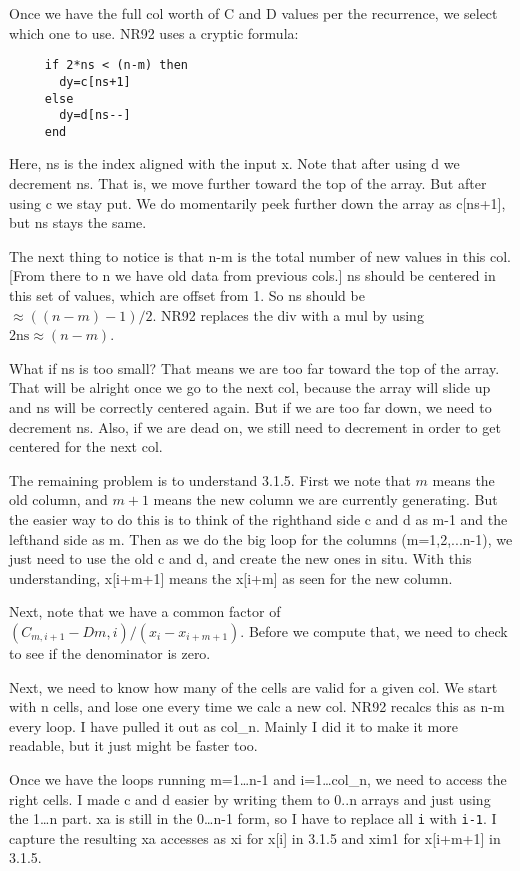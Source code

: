 Once we have the full col worth of C and D values per the
recurrence, we select which one to use.  NR92 uses a cryptic
formula:
\begin{verbatim}
     if 2*ns < (n-m) then
       dy=c[ns+1]
     else
       dy=d[ns--]
     end
\end{verbatim}

Here, ns is the index aligned with the input x.  Note that
after using d we decrement ns.  That is, we move further
toward the top of the array.  But after using c we stay put.
We do momentarily peek further down the array as c[ns+1],
but ns stays the same.

The next thing to notice is that n-m is the total number of
new values in this col.  [From there to n we have old data
from previous cols.]  ns should be centered in this set of
values, which are offset from 1.  So ns should be
$\approx ((n-m)-1)/2$.  NR92 replaces the div with a mul by using
$2 \mbox{ns} \approx (n-m)$.

What if ns is too small?  That means we are too far
toward the top of the array.  That will be alright once we
go to the next col, because the array will slide up and ns
will be correctly centered again.  But if we are too far
down, we need to decrement ns.  Also, if we are dead on, we
still need to decrement in order to get centered for the
next col.

The remaining problem is to understand 3.1.5.  First we note
that $m$ means the old column, and $m+1$ means the new
column we are currently generating.  But the easier way to
do this is to think of the righthand side c and d as m-1 and
the lefthand side as m.  Then as we do the big loop for the
columns (m=1,2,...n-1), we just need to use the old c and d,
and create the new ones in situ.  With this understanding,
x[i+m+1] means the x[i+m] as seen for the new column.

Next, note that we have a common factor of $(C_{m,i+1}-
D{m,i})/(x_i-x_{i+m+1})$.  Before we compute that, we need to
check to see if the denominator is zero.

Next, we need to know how many of the cells are valid for a
given col.  We start with n cells, and lose one every time
we calc a new col.  NR92 recalcs this as n-m every loop.  I
have pulled it out as col\_n.  Mainly I did it to make it
more readable, but it just might be faster too.

Once we have the loops running m=1\dots n-1 and i=1\dots col\_n, we
need to access the right cells.  I made c and d easier by
writing them to 0..n arrays and just using the 1\dots n part.
xa is still in the 0\dots n-1 form, so I have to replace all {\tt i}
with {\tt i-1}.  I capture the resulting xa accesses as xi for
x[i] in 3.1.5 and xim1 for x[i+m+1] in 3.1.5.

